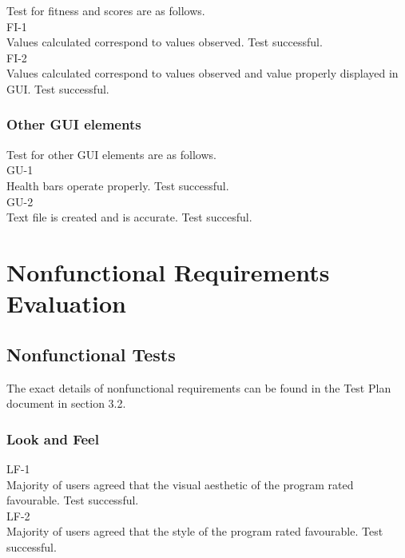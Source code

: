\documentclass[12pt, titlepage]{article}
\begin{document}
Test for fitness and scores are as follows.\\

FI-1\\

Values calculated correspond to values observed. Test successful.\\

FI-2\\

Values calculated correspond to values observed and value properly displayed in GUI. Test successful.

\subsubsection{Other GUI elements}

Test for other GUI elements are as follows.\\

GU-1\\

Health bars operate properly. Test successful.\\

GU-2\\

Text file is created and is accurate. Test succesful.

\section{Nonfunctional Requirements Evaluation}

\subsection{Nonfunctional Tests}

The exact details of nonfunctional requirements can be found in the Test Plan document in section 3.2.


\subsubsection{Look and Feel}

LF-1\\

Majority of users agreed that the visual aesthetic of the program rated favourable. Test successful.\\

LF-2\\

Majority of users agreed that the style of the program rated favourable. Test successful.
\end{document}
